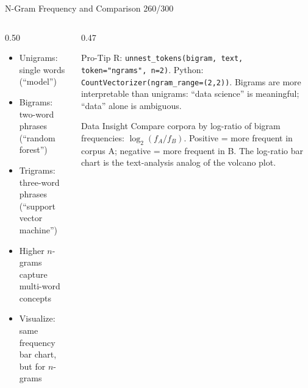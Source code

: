 \documentclass[10pt]{beamer}
\newcommand{\smark}[1]{\hfill{\scriptsize\color{codegray}#1}}
\begin{document}
\begin{frame}{N-Gram Frequency and Comparison}
\smark{260/300}
\begin{columns}[T]
\begin{column}{0.50\textwidth}
\begin{itemize}
    \item Unigrams: single words (``model'')
    \item Bigrams: two-word phrases (``random forest'')
    \item Trigrams: three-word phrases (``support vector machine'')
    \item Higher $n$-grams capture multi-word concepts
    \item Visualize: same frequency bar chart, but for $n$-grams
\end{itemize}
\end{column}
\begin{column}{0.47\textwidth}
\begin{alertblock}{Pro-Tip}
    \scriptsize R: \texttt{unnest\_tokens(bigram, text, token="ngrams", n=2)}. Python: \texttt{CountVectorizer(ngram\_range=(2,2))}. Bigrams are more interpretable than unigrams: ``data science'' is meaningful; ``data'' alone is ambiguous.
\end{alertblock}
\vspace{0.1cm}
\begin{exampleblock}{Data Insight}
    \scriptsize Compare corpora by log-ratio of bigram frequencies: $\log_2(f_A / f_B)$. Positive = more frequent in corpus A; negative = more frequent in B. The log-ratio bar chart is the text-analysis analog of the volcano plot.
\end{exampleblock}
\end{column}
\end{columns}
\end{frame}
\end{document}
